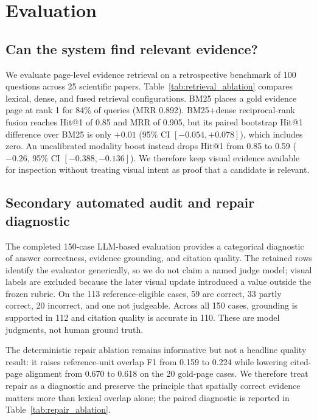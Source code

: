 \section{Evaluation}
\label{sec:evaluation}

\subsection{Can the system find relevant evidence?}
We evaluate page-level evidence retrieval on a retrospective benchmark of 100 questions across 25 scientific papers. Table~\ref{tab:retrieval_ablation} compares lexical, dense, and fused retrieval configurations. BM25 places a gold evidence page at rank 1 for 84\% of queries (MRR 0.892). BM25+dense reciprocal-rank fusion reaches Hit@1 of 0.85 and MRR of 0.905, but its paired bootstrap Hit@1 difference over BM25 is only $+0.01$ (95\% CI $[-0.054,+0.078]$), which includes zero. An uncalibrated modality boost instead drops Hit@1 from 0.85 to 0.59 ($-0.26$, 95\% CI $[-0.388,-0.136]$). We therefore keep visual evidence available for inspection without treating visual intent as proof that a candidate is relevant.





\subsection{Secondary automated audit and repair diagnostic}
The completed 150-case LLM-based evaluation provides a categorical diagnostic of answer correctness, evidence grounding, and citation quality. The retained rows identify the evaluator generically, so we do not claim a named judge model; visual labels are excluded because the later visual update introduced a value outside the frozen rubric. On the 113 reference-eligible cases, 59 are correct, 33 partly correct, 20 incorrect, and one not judgeable. Across all 150 cases, grounding is supported in 112 and citation quality is accurate in 110. These are model judgments, not human ground truth.



The deterministic repair ablation remains informative but not a headline quality result: it raises reference-unit overlap F1 from 0.159 to 0.224 while lowering cited-page alignment from 0.670 to 0.618 on the 20 gold-page cases. We therefore treat repair as a diagnostic and preserve the principle that spatially correct evidence matters more than lexical overlap alone; the paired diagnostic is reported in Table~\ref{tab:repair_ablation}.

